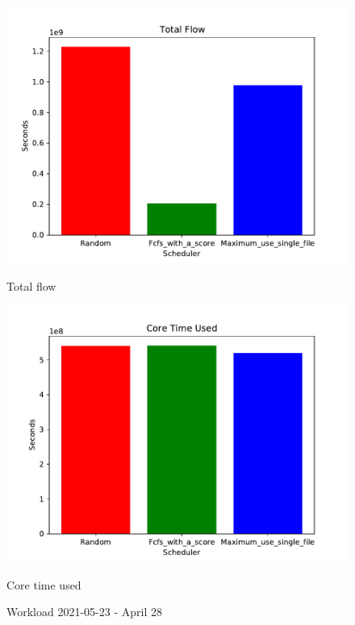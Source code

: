 \documentclass[a4paper]{article}
\begin{document}
\begin{figure}[H]
\begin{minipage}[b]{0.5\linewidth}
    \centering
    \includegraphics[width=1.11\linewidth]{MBSS/plot/2021-05-23_Total_flow.pdf} 
    \caption{Total flow} 
    \vspace{4ex}
  \end{minipage}%
  \begin{minipage}[b]{0.5\linewidth}
    \centering
    \includegraphics[width=1.11\linewidth]{MBSS/plot/2021-05-23_Core_time_used.pdf} 
    \caption{Core time used} 
    \vspace{4ex}
  \end{minipage}
  \caption{Workload 2021-05-23 - April 28}
\end{figure}
\end{document}
